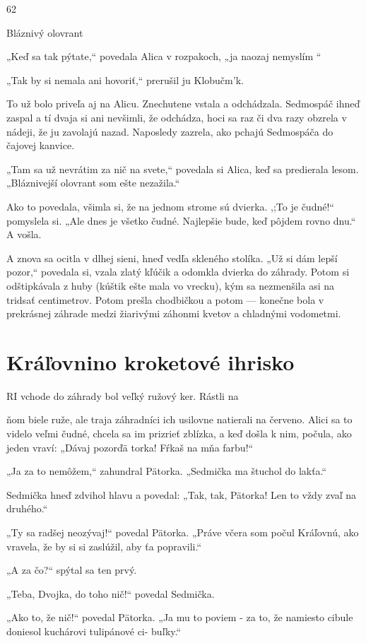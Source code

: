 \documentclass[12pt]{book}
\begin{document}
\begin{Parallel}[p]{}{}
{62

Bláznivý olovrant

„Keď sa tak pýtate,“ povedala Alica v rozpakoch, „ja
naozaj nemyslím  “

„Tak by si nemala ani hovoriť,“ prerušil ju Klobučm'k.

To už bolo priveľa aj na Alicu. Znechutene vstala
a odchádzala. Sedmospáč ihneď zaspal a tí dvaja si ani
nevšimli, že odchádza, hoci sa raz či dva razy obzrela
v nádeji, že ju zavolajú nazad. Naposledy zazrela, ako
pchajú Sedmospáča do čajovej kanvice.

„Tam sa už nevrátim za nič na svete,“ povedala si Alica,
keď sa predierala lesom. „Bláznivejší olovrant som ešte
nezažila.“

Ako to povedala, všimla si, že na jednom strome sú
dvierka. ,;To je čudné!“ pomyslela si. „Ale dnes je všetko
čudné. Najlepšie bude, keď pôjdem rovno dnu.“ A vošla.

A znova sa ocitla v dlhej sieni, hneď vedľa skleného
stolíka. „Už si dám lepší pozor,“ povedala si, vzala zlatý
kľúčik a odomkla dvierka do záhrady. Potom si odštipkávala
z huby (kúštik ešte mala vo vrecku), kým sa nezmenšila asi
na tridsať centimetrov. Potom prešla chodbičkou a potom
— konečne bola v prekrásnej záhrade medzi žiarivými
záhonmi kvetov a chladnými vodometmi.

\section{Kráľovnino kroketové ihrisko}

RI vchode do záhrady bol veľký ružový ker. Rástli na

ňom biele ruže, ale traja záhradníci ich usilovne
natierali na červeno. Alici sa to videlo veľmi čudné, chcela sa
im prizrieť zblízka, a keď došla k nim, počula, ako jeden
vraví: „Dávaj pozorďä torka! Fŕkaš na mňa farbu!“

„Ja za to nemôžem,“ zahundral Pätorka. „Sedmička ma
štuchol do lakťa.“

Sedmička hneď zdvihol hlavu a povedal: „Tak, tak,
Pätorka! Len to vždy zvaľ na druhého.“

„Ty sa radšej neozývaj!“ povedal Pätorka. „Práve včera
som počul Kráľovnú, ako vravela, že by si si zaslúžil, aby ťa
popravili.“

„A za čo?“ spýtal sa ten prvý.

„Teba, Dvojka, do toho nič!“ povedal Sedmička.

„Ako to, že nič!“ povedal Pätorka. „Ja mu to poviem - za
to, že namiesto cibule doniesol kuchárovi tulipánové ci-
buľky.“

}
\end{Parallel}
\end{document}
